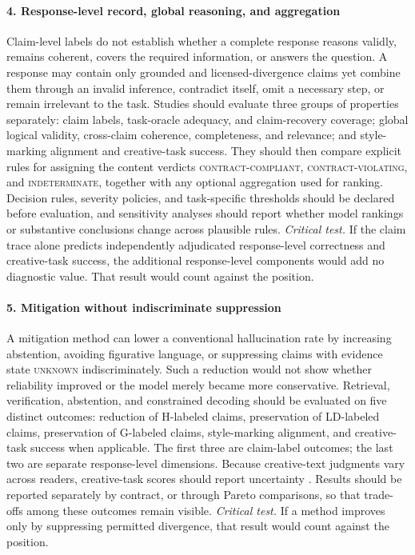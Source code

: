 \documentclass{clv2025}
\newcommand{\LD}{\textsc{LD}}
\newcommand{\Hall}{\textsc{H}}
\newcommand{\Grd}{\textsc{G}}
\begin{document}
\paragraph{4. Response-level record, global reasoning, and aggregation}
Claim-level labels do not establish whether a complete response reasons
validly, remains coherent, covers the required information, or answers the
question.
A response may contain only grounded and licensed-divergence claims yet
combine them through an invalid inference, contradict itself, omit a necessary
step, or remain irrelevant to the task.
Studies should evaluate three groups of properties separately: claim labels,
task-oracle adequacy, and claim-recovery coverage; global logical validity,
cross-claim coherence, completeness, and relevance; and style-marking alignment
and creative-task success. They should then compare explicit rules for
assigning the content verdicts \textsc{contract-compliant},
\textsc{contract-violating}, and \textsc{indeterminate}, together with any
optional aggregation used for ranking.
Decision rules, severity policies, and task-specific thresholds should be
declared before evaluation, and sensitivity analyses should report whether
model rankings or substantive conclusions change across plausible rules.
\emph{Critical test.} If the claim trace alone predicts independently
adjudicated response-level correctness and creative-task success, the additional
response-level components would add no diagnostic value. That result would
count against the position.

\paragraph{5. Mitigation without indiscriminate suppression}
A mitigation method can lower a conventional hallucination rate by increasing
abstention, avoiding figurative language, or suppressing claims with evidence
state \textsc{unknown} indiscriminately.
Such a reduction would not show whether reliability improved or the model
merely became more conservative.
Retrieval, verification, abstention, and constrained decoding should be
evaluated on five distinct outcomes: reduction of \Hall-labeled claims,
preservation of \LD-labeled claims, preservation of \Grd-labeled claims,
style-marking alignment, and creative-task success when applicable.
The first three are claim-label outcomes; the last two are separate
response-level dimensions.
Because creative-text judgments vary across readers, creative-task scores
should report uncertainty
\citep{diedrich_are_2015,marco_reader_2025}.
Results should be reported separately by contract, or through Pareto
comparisons, so that trade-offs among these outcomes remain visible.
\emph{Critical test.} If a method improves only by suppressing permitted
divergence, that result would count against the position.
\end{document}
